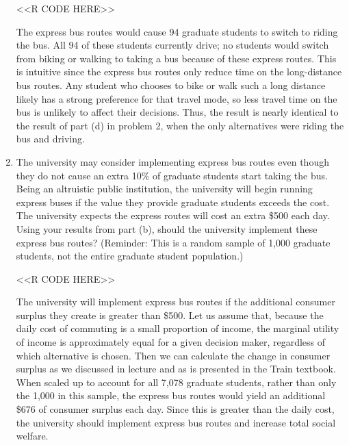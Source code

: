 \documentclass[11pt,letterpaper]{article}
\begin{document}
\begin{enumerate}[label=\alph*., leftmargin=*]
	<<R CODE HERE>>

	The express bus routes would cause 94 graduate students to switch to riding the bus. All 94 of these students currently drive; no students would switch from biking or walking to taking a bus because of these express routes. This is intuitive since the express bus routes only reduce time on the long-distance bus routes. Any student who chooses to bike or walk such a long distance likely has a strong preference for that travel mode, so less travel time on the bus is unlikely to affect their decisions. Thus, the result is nearly identical to the result of part (d) in problem 2, when the only alternatives were riding the bus and driving.

	\item The university may consider implementing express bus routes even though they do not cause an extra 10\% of graduate students start taking the bus. Being an altruistic public institution, the university will begin running express buses if the value they provide graduate students exceeds the cost. The university expects the express routes will cost an extra \$500 each day. Using your results from part (b), should the university implement these express bus routes? (Reminder: This is a random sample of 1,000 graduate students, not the entire graduate student population.)

	<<R CODE HERE>>

	The university will implement express bus routes if the additional consumer surplus they create is greater than \$500. Let us assume that, because the daily cost of commuting is a small proportion of income, the marginal utility of income is approximately equal for a given decision maker, regardless of which alternative is chosen. Then we can calculate the change in consumer surplus as we discussed in lecture and as is presented in the Train textbook. When scaled up to account for all 7,078 graduate students, rather than only the 1,000 in this sample, the express bus routes would yield an additional \$676 of consumer surplus each day. Since this is greater than the daily cost, the university should implement express bus routes and increase total social welfare.
\end{enumerate}
\end{document}
